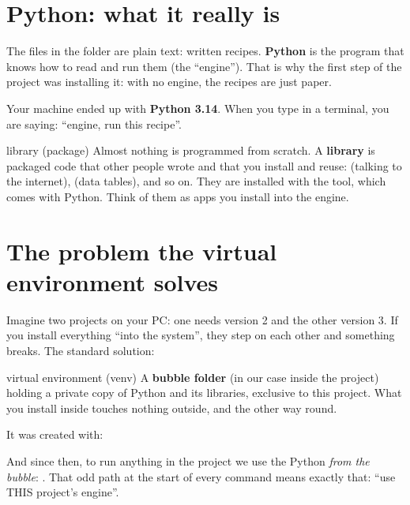 \documentclass[11pt,a4paper]{article}
\begin{document}

\section{Python: what it really is}

The  files in the  folder are plain text: written recipes.
\textbf{Python} is the program that knows how to read and run them (the ``engine''). That is
why the first step of the project was installing it: with no engine, the recipes are just
paper.

Your machine ended up with \textbf{Python 3.14}. When you type  in a
terminal, you are saying: ``engine, run this recipe''.

\begin{concepto}{library (package)}
Almost nothing is programmed from scratch. A \textbf{library} is packaged code that other
people wrote and that you install and reuse:  (talking to the internet),
 (data tables), and so on. They are installed with the  tool,
which comes with Python. Think of them as apps you install into the engine.
\end{concepto}

\section{The problem the virtual environment solves}

Imagine two projects on your PC: one needs  version 2 and the other version
3. If you install everything ``into the system'', they step on each other and something
breaks. The standard solution:

\begin{concepto}{virtual environment (venv)}
A \textbf{bubble folder} (in our case  inside the project) holding a private
copy of Python and its libraries, exclusive to this project. What you install inside touches
nothing outside, and the other way round.

It was created with: 

And since then, to run anything in the project we use the Python \emph{from the bubble}:
. That odd path at the start of
every command means exactly that: ``use THIS project's engine''.
\end{concepto}
\end{document}
